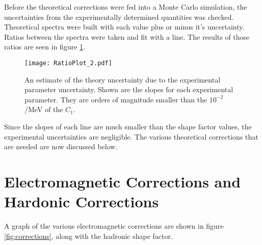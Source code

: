 \documentclass[../MaxHughesThesis.tex]{subfiles}
\begin{document}
\begin{table}[!hbt]
	\centering
	\caption{Variables used in the theory corrections}
	\label{tab:vars}
\end{table}

Before the theoretical corrections were fed into a Monte Carlo simulation, the uncertainties from the experimentally determined quantities was checked.
Theoretical spectra were  built with each value plus or minus it's uncertainty.
Ratios between the spectra were taken and fit with a line.
The results of those ratios are seen in figure \ref{fig:theoryuncer}.

\begin{figure}[!htb]
	\centerline{\texttt{[image: RatioPlot\_2.pdf]}}
	\caption{An estimate of the theory uncertainty due to the experimental parameter uncertainty.	
		 Shown are the slopes for each experimental parameter. 
		 They are orders of magnitude smaller than the $10^{-2}$/MeV of the $C_{1}$.}
	\label{fig:theoryuncer}
\end{figure}

Since the slopes of each line are much smaller than the shape factor values, the experimental uncertainties are negligible. 
The various theoretical corrections that are needed are now discussed below.

\section{Electromagnetic Corrections and Hardonic Corrections}
A graph of the various electromagnetic corrections are shown in figure \ref{fig:corrections}, along with the hadronic shape factor. 
\end{document}
